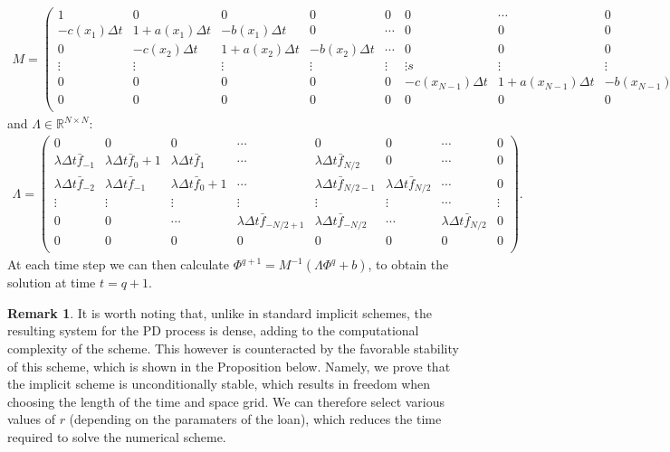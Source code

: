 \documentclass[11pt,reqno]{article}
\theoremstyle{definition}
\newtheorem{remark}[theorem]{Remark}
\begin{document}
\begin{eqnarray}
M=\left(  \begin{array}{cccccccccc}
1 & 0 & 0 & 0 & 0 & 0 & \cdots & 0 & 0  & 0\\
-c(x_1)\Delta t & 1+a(x_1)\Delta t & -b(x_1)\Delta t & 0 &  \cdots & 0 & 0  & 0\\
0 & -c(x_2) \Delta t & 1+a(x_2)\Delta t & - b(x_2) \Delta t &  \cdots & 0 & 0 & 0\\
\vdots & \vdots & \vdots & \vdots & \vdots & \vdots s  & \vdots & \vdots\\
0 & 0 & 0 & 0 & 0 &  -c(x_{N-1})\Delta t & 1+ a(x_{N-1})\Delta t & -b(x_{N-1})\Delta t\\
0 & 0 & 0 & 0 & 0 & 0 & 0& 0 & 0&1\\
\end{array}
\right),
\end{eqnarray}
and $\Lambda \in \mathbb{R}^{N \times N}$:
\begin{eqnarray} \label{matrices_2}
\Lambda=\left(  \begin{array}{cccccccccc}
0 & 0 & 0 & \cdots & 0 & 0 & \cdots & 0 \\
\lambda \Delta t \bar{f}_{-1} & \lambda \Delta t \bar{f}_{0} +1 & \lambda \Delta t \bar{f}_{1}  & \cdots  & \lambda \Delta t \bar{f}_{N/2}  & 0  & \cdots &0\\
\lambda \Delta t \bar{f}_{-2} &\lambda \Delta t \bar{f}_{-1}  & \lambda \Delta t \bar{f}_{0} + 1  & \cdots  & \lambda \Delta t \bar{f}_{N/2-1}  & \lambda \Delta t \bar{f}_{N/2}  & \cdots& 0\\
\vdots & \vdots & \vdots & \vdots & \vdots & \vdots & \cdots & \vdots \\
0 & 0  & \cdots & \lambda \Delta t \bar{f}_{-N/2+1 } & \lambda \Delta t \bar{f}_{-N/2} & \cdots & \lambda \Delta t \bar{f}_{N/2} & 0\\
0 & 0 & 0 & 0 & 0 & 0 & 0 & 0 \\
\end{array}
\right).
\end{eqnarray}
At each time step we can then calculate $\Phi^{q+1} = M^{-1} (\Lambda \Phi^q +b)$, to obtain the solution at time $t = q+1$. 

\begin{remark}
	It is worth noting that, unlike in standard implicit schemes, the resulting system for the PD process is dense, adding to the computational complexity of the scheme. This however is counteracted by the favorable stability of this scheme, which is shown in the Proposition below. Namely, we prove that the implicit scheme is unconditionally stable, which results in freedom when choosing the length of the time and space grid. We can therefore select various values of $r$ (depending on the paramaters of the loan), which reduces the time required to solve the numerical scheme.
\end{remark}
\end{document}
